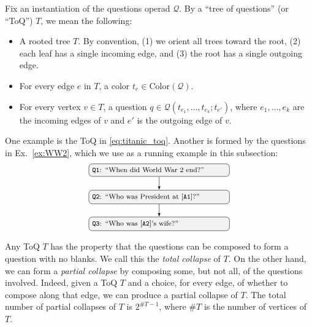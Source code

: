 \documentclass{article}
\theoremstyle{plain}
\theoremstyle{definition}
\theoremstyle{remark}
\theoremstyle{definition}
\newcommand\cQ{\mathcal{Q}}
\begin{document}
Fix an instantiation of the questions operad $\cQ$.
By a ``tree of questions'' (or ``ToQ'') $T$, we mean the following:
\begin{itemize}
\item A rooted tree $T$.
By convention, (1) we orient all trees toward the root, (2) each leaf has a single incoming edge, and (3) the root has a single outgoing edge.

\item For every edge $e$ in $T$, a color $t_e \in \mathrm{Color}(\cQ)$.

\item For every vertex $v \in T$, a question $q \in \cQ(t_{e_1},\ldots,t_{e_k};t_{e'})$, where $e_1,\ldots,e_k$ are the incoming edges of $v$ and $e'$ is the outgoing edge of $v$.
\end{itemize}

One example is the ToQ in \eqref{eq:titanic_toq}.
Another is formed by the questions in Ex.~\ref{ex:WW2}, which we use as a running example in this subsection:
\begin{equation}
\label{eq:ww2_toq}
\footnotesize
\begin{tikzpicture}[
  >={Latex[length=1.5mm]},
  bubble/.style={
    draw, rounded corners=4pt, align=left,
    fill=black!5, inner sep=4pt, text width=5.5cm
  },
  baseline={(current bounding box.center)}
]

\node[bubble] at (0,0) (q3) {%
  $\mathtt{Q3}$: ``Who was [$\mathtt{A2}$]'s wife?''
};

\node[bubble] at (0,1.1) (q2) {%
  $\mathtt{Q2}$: ``Who was President at [$\mathtt{A1}$]?''
};

\node[bubble] at (0,2.2) (q1) {%
  $\mathtt{Q1}$: ``When did World War 2 end?''
};

\draw[->] (q1.south) -- (q2.north);
\draw[->] (q2.south) -- (q3.north);
\end{tikzpicture}
\end{equation}

Any ToQ $T$ has the property that the questions can be composed to form a question with no blanks.
We call this the \emph{total collapse} of $T$.
On the other hand, we can form a \emph{partial collapse} by composing some, but not all, of the questions involved.
Indeed, given a ToQ $T$ and a choice, for every edge, of whether to compose along that edge, we can produce a partial collapse of $T$.
The total number of partial collapses of $T$ is $2^{\#T-1}$, where $\#T$ is the number of vertices of $T$.
\end{document}
